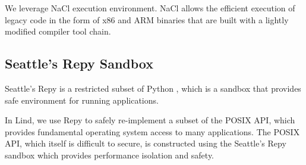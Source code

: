 \par
We leverage NaCl execution environment. NaCl allows the efficient execution of legacy code in the form of x86 and ARM binaries that are built with a lightly modified compiler tool chain.


\subsection{Seattle's Repy Sandbox}

\par
Seattle's Repy is a restricted subset of Python \cite{Repy:10}, which is a sandbox that provides safe environment for running applications.

\par
In Lind, we use Repy to safely re-implement a subset of the POSIX API, which provides fundamental operating system access to many applications. The POSIX API, which itself is difficult to secure, is constructed using the Seattle's Repy sandbox which provides performance isolation and safety. 
